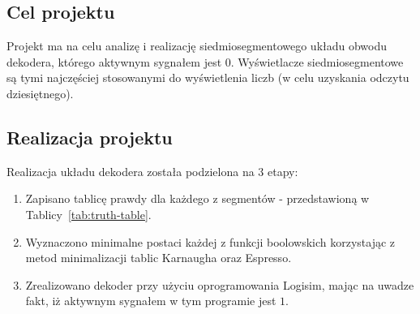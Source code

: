 \subsection{Cel projektu}\label{subsec:intro-goal}
Projekt ma na celu analizę i realizację siedmiosegmentowego układu obwodu dekodera, którego aktywnym sygnałem jest $0$.
Wyświetlacze siedmiosegmentowe są tymi najczęściej stosowanymi do
wyświetlenia liczb (w celu uzyskania odczytu dziesiętnego).

\subsection{Realizacja projektu}\label{subsec:intro-how}
Realizacja układu dekodera została podzielona na 3 etapy:
\begin{enumerate}
    \item Zapisano tablicę prawdy dla każdego z segmentów - przedstawioną w Tablicy~\ref{tab:truth-table}.
    \item Wyznaczono minimalne postaci każdej z funkcji boolowskich korzystając
          z metod minimalizacji tablic Karnaugha oraz Espresso.
    \item Zrealizowano dekoder przy użyciu oprogramowania Logisim, mając na uwadze fakt,
          iż aktywnym sygnałem w tym programie jest $1$.
\end{enumerate}

